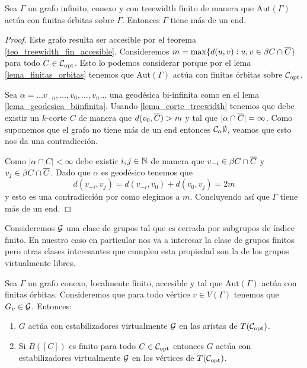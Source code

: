 \documentclass[tesis.tex]{subfiles}
\newcommand{\aut}{\text{Aut}}
\begin{document}
\begin{lema}\label{lema_tw_mas_1_end}
	Sea $\Gamma$ un grafo infinito, conexo y con treewidth finito de manera que $\aut(\Gamma)$ actúa con finitas órbitas sobre $\Gamma$.
	Entonces $\Gamma$ tiene más de un end.
\end{lema}
\begin{proof}
	Este grafo resulta ser accesible por el teorema \ref{teo_treewidth_fin_accesible}.
	Consideremos $m = \max \{  d(u,v) : u,v \in \beta C \cap \overline C \}$ para todo $C \in {\cal C}_{\text{opt}}$.
	Esto lo podemos considerar porque por el lema \ref{lema_finitas_orbitas} tenemos que $\aut(\Gamma)$ actúa con finitas órbitas sobre ${\cal C}_{\text{opt}}$.
	
	Sea $\alpha = \dots v_{-n}, \dots, v_{0}, \dots, v_{n} \dots$ una geodésica bi-infinita como en el lema \ref{lema_geodesica_biinfinita}.
	Usando \ref{lema_corte_treewidth} tenemos que debe existir un $k$-corte $C$ de manera que $d(v_{0}, \overline C) > m$ y tal que $|\alpha \cap \overline C|=\infty$.
	Como suponemos que el grafo no tiene más de un end entonces ${\cal{C}}_{\alpha} \emptyset$, veamos que esto nos da una contradicción.
	
	Como $|\alpha \cap C| < \infty$ debe existir $i,j \in \mathbb{N}$ de manera que $v_{-i} \in \beta C \cap \overline C$ y $v_{j} \in \beta C \cap \overline C$.
	Dado que $\alpha$ es geodésico tenemos que
	\[
		d(v_{-i},v_{j}) = d(v_{-i},v_{0}) + d(v_{0}, v_{j}) = 2m
	\]
	y esto es una contradicción por como elegimos a $m$. 
	Concluyendo así que $\Gamma$ tiene más de un end.
\end{proof}

Consideremos ${\cal G}$ una clase de grupos tal que es cerrada por subgrupos de índice finito.
En nuestro caso en particular nos va a interesar la clase de grupos finitos pero otras clases interesantes que cumplen esta propiedad son la de los grupos virtualmente libres.

\begin{prop}\label{prop_clase_grupos_accion}
	Sea $\Gamma$ un grafo conexo, localmente finito, accesible y tal que $\aut(\Gamma)$ actúa con finitas órbitas.
	Consideremos que para todo vértice $v \in V(\Gamma)$ tenemos que $G_{v} \in {\cal G}$.
	Entonces:
	\begin{enumerate}
		\item $G$ actúa con estabilizadores virtualmente ${\cal G}$ en las aristas de $T({\cal C}_{\text{opt}})$.
		\item Si $B([C])$ es finito para todo $C \in {\cal C}_{\text{opt}}$ entonces $G$ actúa con estabilizadores virtualmente ${\cal G}$ en los vértices de $T({\cal C}_{\text{opt}})$.
	\end{enumerate}	
\end{prop}
\end{document}
